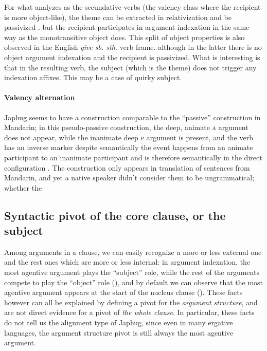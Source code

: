 \documentclass[a4paper, oneside, 12pt]{report}
\newcommand*{\citesec}[1]{\S~{#1}}
\newcommand*{\citepage}[1]{p.~{#1}}
\newcommand*{\citepages}[1]{pp.~{#1}}
\newcommand{\form}[1]{\emph{#1}}
\newcommand{\category}[1]{\textsc{#1}}
\begin{document}
For what \citet[\citesec{14.4.2}]{jacques2021grammar} analyzes as 
the secundative verbs (the valency class where the recipient is more object-like),
the theme can be extracted in relativization \citep[\citepages{581}]{jacques2021grammar}
and be passivized \citep[\citesec{18.1.4}]{jacques2021grammar}.
but the recipient participates in argument indexation
in the same way as the monotransitive object does.
This split of object properties is also observed in the English \form{give sb. sth.} verb frame.
although in the latter there is no object argument indexation
and the recipient is passivized.
What is interesting is that in the resulting verb,
the subject (which is the theme) does not trigger any indexation affixes.
This may be a case of quirky subject.

\paragraph*{Valency alternation} 
Japhug seems to have a construction comparable to
the ``passive'' construction in Mandarin;
in this pseudo-passive construction,
the deep, animate \category{a} argument does not appear, 
while the inanimate deep \category{p} argument is present, 
and the verb has an inverse marker 
despite semantically the event happens 
from an animate participant to an inanimate participant
and is therefore semantically in the direct configuration
\citep[\citepage{575}]{jacques2021grammar}.
The construction only appears in translation of sentences from Mandarin,
and yet a native speaker didn't consider them to be ungrammatical;
whether the 


\subsection{Syntactic pivot of the core clause, or the subject}\label{sec:grammatical.clause.subject}

Among arguments in a clause, we can easily recognize a more or less external one
and the rest ones which are more or less internal:
in argument indexation, 
the most agentive argument plays the ``subject'' role,
while the rest of the arguments compete to play the ``object'' role
(),
and by default we can observe that the most agentive argument 
appears at the start of the nucleus clause 
().
These facts however can all be explained by defining a pivot for the \emph{argument structure},
and are not direct evidence for a pivot of \emph{the whole clause}.
In particular, these facts do not tell us the alignment type of Japhug,
since even in many ergative languages, the argument structure pivot 
is still always the most agentive argument.
\end{document}
